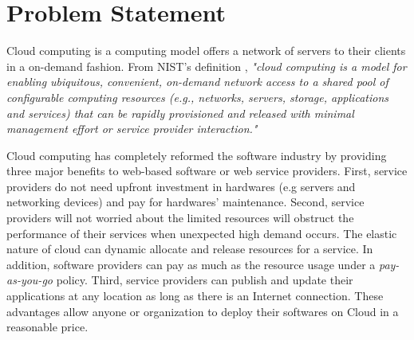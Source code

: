 \section{Problem Statement}



Cloud computing is a computing model offers a network of servers to their 
clients in a on-demand fashion. From NIST's definition \cite{Mell:2011ix}, \textit{"cloud computing is a model for enabling ubiquitous, convenient, on-demand network access to a shared pool of configurable computing resources (e.g., networks, servers, storage, applications and services) that can be rapidly provisioned and released with minimal management effort or service provider interaction."}

Cloud computing has completely reformed the software industry \cite{Buyya:2009ix} by providing three major benefits to web-based software or web service providers.
First, service providers do not need upfront investment in hardwares (e.g servers and networking devices) and pay for hardwares' maintenance. 
Second, service providers will not worried about the limited resources will obstruct the performance of their services when unexpected high demand occurs. The elastic nature of cloud can dynamic allocate and release resources for a service. In addition, software providers can pay as much as the resource usage under a \emph{pay-as-you-go} policy.
Third, service providers can publish and update their applications at any location 
as long as there is an Internet connection. 
These advantages allow anyone or organization to deploy their softwares on Cloud in
a reasonable price.  


